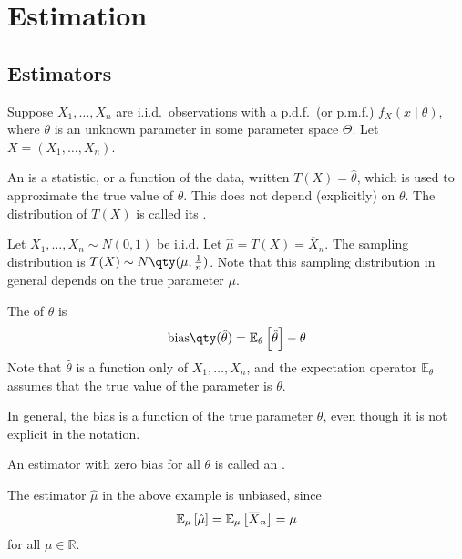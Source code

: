 \section{Estimation}

\subsection{Estimators}
Suppose $X_1, \dots, X_n$ are i.i.d.\ observations with a p.d.f.\ (or p.m.f.) $f_X(x \mid \theta)$, where $\theta$ is an unknown parameter in some parameter space $\Theta$.
Let $X = (X_1, \dots, X_n)$.

\begin{definition}[Estimator]
	An  is a statistic, or a function of the data, written $T(X) = \hat\theta$, which is used to approximate the true value of $\theta$.
	This does not depend (explicitly) on $\theta$.
	The distribution of $T(X)$ is called its .
\end{definition}

\begin{example}
	Let $X_1, \dots, X_n \sim N(0,1)$ be i.i.d.
	Let $\hat \mu = T(X) = \overline X_n$.
	The sampling distribution is $T(X) \sim N\qty(\mu, \frac{1}{n})$.
	Note that this sampling distribution in general depends on the true parameter $\mu$.
\end{example}

\begin{definition}[Bias]
	The  of $\hat \theta$ is
	\begin{align*}
		\mathrm{bias}\qty(\hat \theta) = \esub{\theta}{\hat \theta} - \theta
	\end{align*}
	Note that $\hat \theta$ is a function only of $X_1, \dots, X_n$, and the expectation operator $\mathbb E_\theta$ assumes that the true value of the parameter is $\theta$.
\end{definition}

\begin{remark}
	In general, the bias is a function of the true parameter $\theta$, even though it is not explicit in the notation.
\end{remark}

\begin{definition}
	An estimator with zero bias for all $\theta$ is called an .
\end{definition}

\begin{example}
	The estimator $\hat \mu$ in the above example is unbiased, since
	\begin{align*}
		\mathbb{E}_{\mu}\left[{\hat \mu}\right] = \mathbb{E}_{\mu}\left[{\overline X_n}\right] = \mu
	\end{align*}
	for all $\mu \in \mathbb R$.
\end{example}

